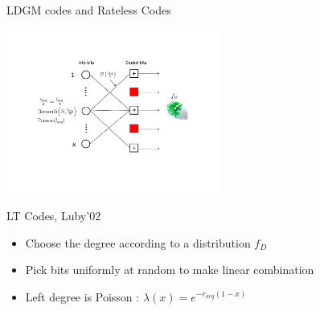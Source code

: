 \documentclass[10pt,xcolor=table]{beamer}
\begin{document}
\begin{frame}{LDGM codes and Rateless Codes}
\begin{center}
  \includegraphics[width=2.75in]{./Figures/ratelesserasures1}
\end{center}

\begin{block}{LT Codes, Luby'02}
\begin{itemize}
  \item Choose the degree according to a distribution $f_D$
  \item Pick bits uniformly at random to make linear combination
  \item Left degree is Poisson : $\lambda(x) = e^{-r_{avg}(1-x)}$
\end{itemize}
\end{block}
\end{frame}
\end{document}
